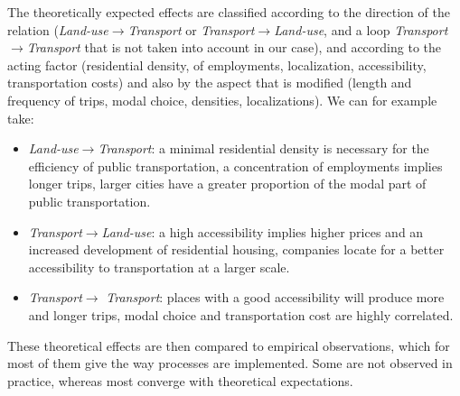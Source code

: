 \documentclass[10pt]{article}
\begin{document}
The theoretically expected effects are classified according to the direction of the relation (\textit{Land-use}$\rightarrow$\textit{Transport} or \textit{Transport}$\rightarrow$\textit{Land-use}, and a loop \textit{Transport}$\rightarrow$\textit{Transport} that is not taken into account in our case), and according to the acting factor (residential density, of employments, localization, accessibility, transportation costs) and also by the aspect that is modified (length and frequency of trips, modal choice, densities, localizations). We can for example take:
		\begin{itemize}
		\item \textit{Land-use}$\rightarrow$\textit{Transport}: a minimal residential density is necessary for the efficiency of public transportation, a concentration of employments implies longer trips, larger cities have a greater proportion of the modal part of public transportation.
		\item \textit{Transport}$\rightarrow$\textit{Land-use}: a high accessibility implies higher prices and an increased development of residential housing, companies locate for a better accessibility to transportation at a larger scale.
		\item \textit{Transport}$\rightarrow$ \textit{Transport}: places with a good accessibility will produce more and longer trips, modal choice and transportation cost are highly correlated. 
		\end{itemize}
				
These theoretical effects are then compared to empirical observations, which for most of them give the way processes are implemented. Some are not observed in practice, whereas most converge with theoretical expectations.

\end{document}
